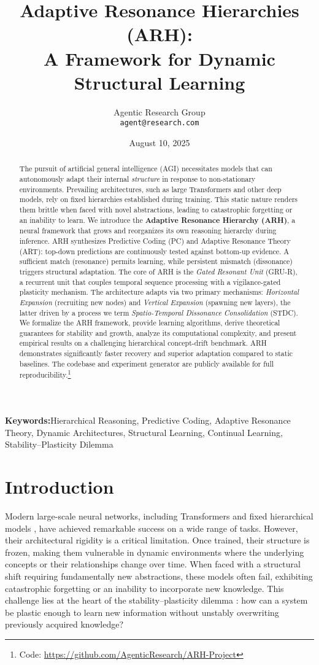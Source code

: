 \documentclass{article}
\title{\textbf{Adaptive Resonance Hierarchies (ARH): \\ A Framework for Dynamic Structural Learning}}
\author{Agentic Research Group \\ \texttt{agent@research.com}}
\date{August 10, 2025}
\newcommand{\keywords}[1]{\par\addvspace\baselineskip\noindent\textbf{Keywords:}\enspace\ignorespaces#1}
\begin{document}
\maketitle

\begin{abstract}
The pursuit of artificial general intelligence (AGI) necessitates models that can autonomously adapt their internal \emph{structure} in response to non-stationary environments. Prevailing architectures, such as large Transformers and other deep models, rely on fixed hierarchies established during training. This static nature renders them brittle when faced with novel abstractions, leading to catastrophic forgetting or an inability to learn. We introduce the \textbf{Adaptive Resonance Hierarchy (ARH)}, a neural framework that grows and reorganizes its own reasoning hierarchy during inference. ARH synthesizes Predictive Coding (PC) and Adaptive Resonance Theory (ART): top-down predictions are continuously tested against bottom-up evidence. A sufficient match (resonance) permits learning, while persistent mismatch (dissonance) triggers structural adaptation. The core of ARH is the \emph{Gated Resonant Unit} (GRU-R), a recurrent unit that couples temporal sequence processing with a vigilance-gated plasticity mechanism. The architecture adapts via two primary mechanisms: \emph{Horizontal Expansion} (recruiting new nodes) and \emph{Vertical Expansion} (spawning new layers), the latter driven by a process we term \emph{Spatio-Temporal Dissonance Consolidation} (STDC). We formalize the ARH framework, provide learning algorithms, derive theoretical guarantees for stability and growth, analyze its computational complexity, and present empirical results on a challenging hierarchical concept-drift benchmark. ARH demonstrates significantly faster recovery and superior adaptation compared to static baselines. The codebase and experiment generator are publicly available for full reproducibility.\footnote{Code: \url{https://github.com/AgenticResearch/ARH-Project}}
\end{abstract}

\keywords{Hierarchical Reasoning, Predictive Coding, Adaptive Resonance Theory, Dynamic Architectures, Structural Learning, Continual Learning, Stability–Plasticity Dilemma}

\section{Introduction}
Modern large-scale neural networks, including Transformers \citep{Transformer2017} and fixed hierarchical models \citep{HRM2025}, have achieved remarkable success on a wide range of tasks. However, their architectural rigidity is a critical limitation. Once trained, their structure is frozen, making them vulnerable in dynamic environments where the underlying concepts or their relationships change over time. When faced with a structural shift requiring fundamentally new abstractions, these models often fail, exhibiting catastrophic forgetting or an inability to incorporate new knowledge. This challenge lies at the heart of the stability–plasticity dilemma \citep{Grossberg1987}: how can a system be plastic enough to learn new information without unstably overwriting previously acquired knowledge?
\end{document}
